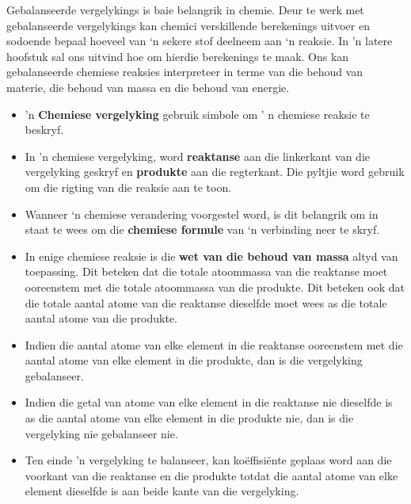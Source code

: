 Gebalanseerde vergelykings is baie belangrik in chemie. Deur te werk met gebalanseerde vergelykings kan chemici  verskillende berekenings uitvoer en sodoende bepaal hoeveel van ‘n sekere stof deelneem aan ‘n reaksie. In 'n latere hoofstuk sal ons uitvind hoe om hierdie berekenings te maak. Ons kan gebalanseerde chemiese reaksies interpreteer in terme van die behoud van materie, die behoud van massa en die behoud van energie.

            \nopagebreak
      \label{m38727*id67171}\begin{itemize}[noitemsep]
            \label{m38727*uid36}\item 'n \textbf{Chemiese vergelyking} gebruik simbole om ' n chemiese reaksie te beskryf.
\label{m38727*uid37}\item In 'n chemiese vergelyking, word \textbf{reaktanse} aan die linkerkant van die vergelyking geskryf en \textbf{produkte} aan die regterkant. Die pyltjie word gebruik om die rigting van die reaksie aan te toon.
\label{m38727*uid38}\item Wanneer ‘n chemiese verandering voorgestel word, is dit belangrik om in staat te wees om die \textbf{chemiese formule} van ‘n verbinding neer te skryf.
\label{m38727*uid39}\item In enige chemiese reaksie is die \textbf{wet van die behoud van massa} altyd van toepassing. Dit beteken dat die totale atoommassa van die reaktanse moet ooreenstem met die totale atoommassa van die produkte. Dit beteken ook dat die totale aantal atome van die reaktanse dieselfde moet wees as die totale aantal atome van die produkte.
\label{m38727*uid41}\item Indien die aantal atome van elke element in die reaktanse ooreenstem met die aantal atome van elke element in die produkte, dan is die vergelyking gebalanseer.
\label{m38727*uid42}\item Indien die getal van atome van elke element in die reaktanse nie dieselfde is as die aantal atome van elke element in die produkte nie, dan is die vergelyking nie gebalanseer nie.
\item Ten einde 'n vergelyking te balanseer,  kan koëffisiënte geplaas word aan die voorkant van die reaktanse en die  produkte totdat die aantal atome van elke element dieselfde is aan beide kante van die vergelyking.
\end{itemize}


